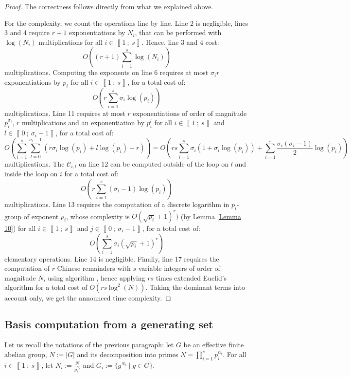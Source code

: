\documentclass[a4paper,10pt]{report}
\theoremstyle{definition}
\theoremstyle{plain}
\theoremstyle{definition}
\newcommand{\m}[1]{\mathcal{#1}}
\renewcommand{\i}[2]{\left\llbracket #1~;~#2\right\rrbracket}
\renewcommand{\(}{\left(}
\renewcommand{\)}{\right)}
\begin{document}
\begin{proof}
The correctness follows directly from what we explained above. 

For the complexity, we count the operations line by line. Line 2 is negligible, lines 3 and 4 require $r+1$ exponentiations by $N_i$, that can be performed with $\log(N_i)$ multiplications for all $i\in\i{1}{s}$. Hence, line 3 and 4 cost:
\[O\((r+1)\sum_{i=1}^s \log(N_i)\)\] 
multiplications. Computing the exponents on line 6 requires at most $\sigma_i r$ exponentiations by $p_i$ for all $i\in\i{1}{s}$, for a total cost of:
\[O\(r\sum_{i=1}^s\sigma_i\log(p_i)\)\]
multiplications.  Line 11 requires at most $r$ exponentiations of order of magnitude $p_i^{\sigma_i}$, $r$ multiplications and an exponentiation by $p_i^{l}$ for all $i\in\i{1}{s}$ and $l\in\i{0}{\sigma_i-1}$, for a total cost of:
\[O\(\sum_{i=1}^s\sum_{l=0}^{\sigma_i-1}(r\sigma_i\log(p_i)+l\log(p_i)+r)\)=O\(rs\sum_{i=1}^s\sigma_i(1+\sigma_i\log(p_i))+\sum_{i=1}^s\frac{\sigma_i(\sigma_i-1)}{2}\log(p_i)\)\]
multiplications. The $\m{C}_{i,l}$ on line 12 can be computed outside of the loop on $l$ and inside the loop on $i$ for a total cost of:
\[O\(r\sum_{i=1}^s(\sigma_i-1)\log(p_i)\)\]
multiplications. Line 13 requires the computation of a discrete logarithm in $p_i$-group of exponent $p_i$, whose complexity is $O(\sqrt{p_i}+1)^r)$ (by Lemma \ref{Lemma 10}) for all $i\in\i{1}{s}$ and $j\in\i{0}{\sigma_i-1}$, for a total cost of:
\[O\(\sum_{i=1}^s\sigma_i(\sqrt{p_i}+1)^r\)\]
elementary operations. Line 14 is negligible. Finally, line 17 requires the computation of $r$ Chinese remainders with $s$ variable integers of order of magnitude $N$, using algorithm \cite[algorithm 1.3.12]{Cohen1}, hence applying $rs$ times extended Euclid's algorithm for a total cost of $O(rs\log^2(N))$. Taking the dominant terms into account only, we get the announced time complexity.
\end{proof}


\subsection{Basis computation from a generating set}

Let us recall the notations of the previous paragraph: let $G$ be an effective finite abelian group, $N:=|G|$ and its decomposition into primes $N=\prod_{i=1}^s p_i^{\alpha_i}$. For  all $i\in\i{1}{s}$, let $N_i:=\frac{N}{p_i^{\alpha_i}}$ and $G_i:=\{g^{N_i}\mid g\in G\}$.
\end{document}
